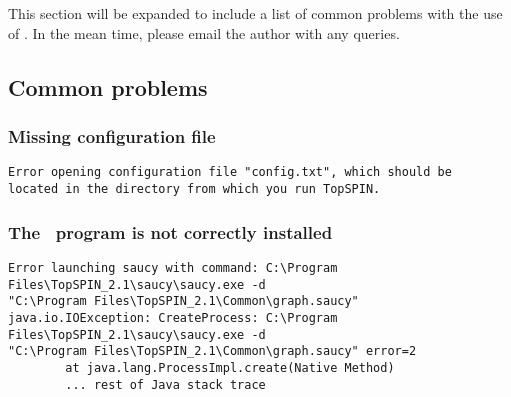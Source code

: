 \chapter{\troubleshooting}\label{chapter:troubleshooting}

This section will be expanded to include a list of common problems
with the use of \topspin.  In the mean time, please email the author
with any queries.


\section{Common problems}\label{sec:troubleshooting:common}


\subsection{Missing configuration file}


\exampleerrormessage

\begin{lstlisting}
Error opening configuration file "config.txt", which should be
located in the directory from which you run TopSPIN.
\end{lstlisting}



\subsection{The \saucy\ program is not correctly installed}


\exampleerrormessage

\begin{lstlisting}
Error launching saucy with command: C:\Program Files\TopSPIN_2.1\saucy\saucy.exe -d
"C:\Program Files\TopSPIN_2.1\Common\graph.saucy"
java.io.IOException: CreateProcess: C:\Program Files\TopSPIN_2.1\saucy\saucy.exe -d
"C:\Program Files\TopSPIN_2.1\Common\graph.saucy" error=2
        at java.lang.ProcessImpl.create(Native Method)
        ... rest of Java stack trace
\end{lstlisting}

